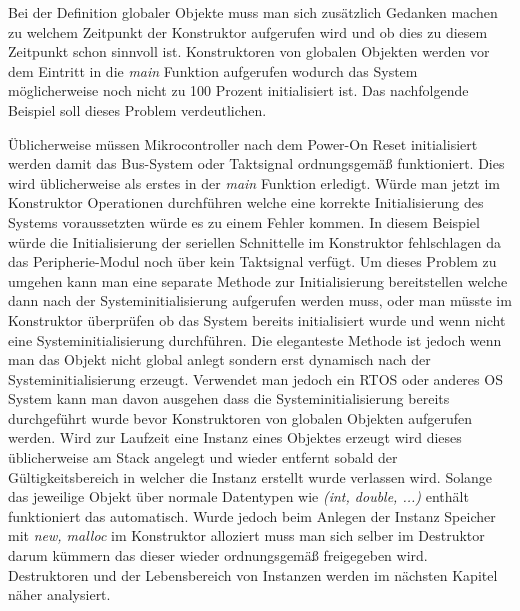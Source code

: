 \documentclass[MES,Master,ngerman]{twbook}%
\begin{document}
\begin{figure}[!htb]
	\begin{subfigure}[b]{0.5\textwidth}
		
		\label{fig:25}
	\end{subfigure}
	\begin{subfigure}[b]{0.5\textwidth}
		
		\label{fig:26}
	\end{subfigure}
\end{figure}

Bei der Definition globaler Objekte muss man sich zusätzlich Gedanken machen zu welchem Zeitpunkt der Konstruktor aufgerufen wird und ob dies zu diesem Zeitpunkt schon sinnvoll ist. Konstruktoren von globalen Objekten werden vor dem Eintritt in die \textit{main} Funktion aufgerufen wodurch das System möglicherweise noch nicht zu 100 Prozent initialisiert ist. Das nachfolgende Beispiel soll dieses Problem verdeutlichen. 

\begin{figure}[!htb]
	
	\label{fig:27}
\end{figure}

Üblicherweise müssen Mikrocontroller nach dem Power-On Reset initialisiert werden damit das Bus-System oder Taktsignal ordnungsgemäß funktioniert. Dies wird üblicherweise als erstes in der \textit{main} Funktion erledigt. Würde man jetzt im Konstruktor Operationen durchführen welche eine korrekte Initialisierung des Systems voraussetzten würde es zu einem Fehler kommen. In diesem Beispiel würde die Initialisierung der seriellen Schnittelle im Konstruktor fehlschlagen da das Peripherie-Modul noch über kein Taktsignal verfügt. Um dieses Problem zu umgehen kann man eine separate Methode zur Initialisierung bereitstellen welche dann nach der Systeminitialisierung aufgerufen werden muss, oder man müsste im Konstruktor überprüfen ob das System bereits initialisiert wurde und wenn nicht eine Systeminitialisierung durchführen. Die eleganteste Methode ist jedoch wenn man das Objekt nicht global anlegt sondern erst dynamisch nach der Systeminitialisierung erzeugt. Verwendet man jedoch ein RTOS oder anderes OS System kann man davon ausgehen dass die Systeminitialisierung bereits durchgeführt wurde bevor Konstruktoren von globalen Objekten aufgerufen werden. \newline\newline
Wird zur Laufzeit eine Instanz eines Objektes erzeugt wird dieses üblicherweise am Stack angelegt und wieder entfernt sobald der Gültigkeitsbereich in welcher die Instanz erstellt wurde verlassen wird. Solange das jeweilige Objekt über normale Datentypen wie \textit{(int, double, ...)} enthält funktioniert das automatisch. Wurde jedoch beim Anlegen der Instanz Speicher mit \textit{new, malloc} im Konstruktor alloziert muss man sich selber im Destruktor darum kümmern das dieser wieder ordnungsgemäß freigegeben wird. Destruktoren und der Lebensbereich von Instanzen werden im nächsten Kapitel näher analysiert.
\end{document}
